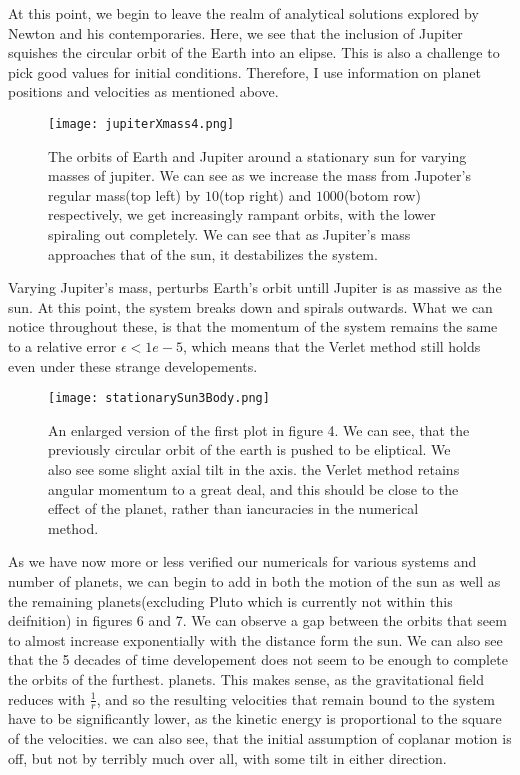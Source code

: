 \documentclass[10pt, twocolumn]{revtex4-1}
\begin{document}
At this point, we begin to leave the realm of analytical solutions explored by Newton and his contemporaries. Here, we see that 
the inclusion of Jupiter squishes the circular orbit of the Earth into an elipse. This is also a challenge to pick good values for 
initial conditions. Therefore, I use information on planet positions and velocities\cite{MathiasPlanetvalues} as mentioned above. 
\begin{figure}[hbtp]
    \texttt{[image: jupiterXmass4.png]}
    \caption{The orbits of Earth and Jupiter around a stationary sun for varying masses of jupiter. We can see 
    as we increase the mass from Jupoter's regular mass(top left) by $10$(top right) and $1 000$(botom row) 
    respectively, we get increasingly rampant orbits, with the lower spiraling out completely. We can see that as
    Jupiter's mass approaches that of the sun, it destabilizes the system. }
    \label{}
\end{figure}
Varying Jupiter's mass, perturbs Earth's orbit untill Jupiter is as massive as the sun. At this point, the system breaks down and spirals outwards. 
What we can notice throughout these, is that the momentum of the system remains the same to a relative error $\epsilon < 1e-5$, which means that 
the Verlet method still holds even under these strange developements. 

\begin{figure}[hbtp]
    \texttt{[image: stationarySun3Body.png]}
    \caption{An enlarged version of the first plot in figure 4. We can see, that the previously circular orbit of
        the earth is pushed to be eliptical. We also see some slight axial tilt in the axis. the Verlet method retains
        angular momentum to a great deal, and this should be close to the effect of the planet, rather than iancuracies 
        in the numerical method.}
    \label{}
\end{figure}


As we have now more or less verified our numericals for various systems and number of planets, we can begin to add in both the motion 
of the sun as well as the remaining planets(excluding Pluto which is currently not within this deifnition) in figures 6 and 7. We can observe a gap between
the orbits that seem to almost increase exponentially with the distance form the sun. We can also see that the 5 decades of time developement 
does not seem to be enough to complete the orbits of the furthest. planets. This makes sense, as the gravitational field reduces with 
$\frac{1}{r}$, and so the resulting velocities that remain bound to the system have to be significantly lower, as the kinetic energy is 
proportional to the square of the velocities. we can also see, that the initial assumption of coplanar motion is off, but not by terribly 
much over all, with some tilt in either direction. 
\end{document}
